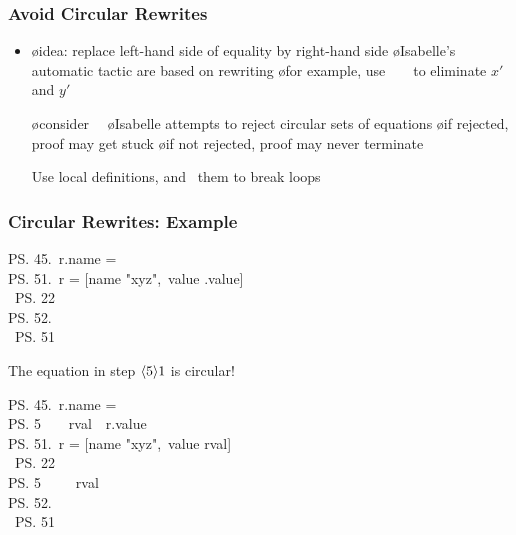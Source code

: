 \begin{frame}
  \frametitle{Avoid Circular Rewrites}

  \begin{itemize}
  \item {}

    \begin{itemize}
    \o idea: replace left-hand side of equality by right-hand side
    \o Isabelle's automatic tactic are based on rewriting
    \o for example, use\ \ \ \ to eliminate $x'$ and $y'$    \end{itemize}

\pause

  \oo {}

    \begin{itemize}
    \o consider\ \ 
    \o Isabelle attempts to reject circular sets of equations
    \o if rejected, proof may get stuck
    \o if not rejected, proof may never terminate
    \end{itemize}

  \oo \alert{Use local definitions, and \HIDE\ them to break loops}
  \end{itemize}
\end{frame}

\begin{frame}
  \frametitle{Circular Rewrites: Example}

  \qquad\begin{tlablock}
    \ps{4}{5.}\ r.name = \\
    \quad\ps{5}{1.}\ r = [name \mapsto "xyz",\ value \mapsto {}.value]\\
    \quad\quad\BY\ \ps{2}{2}\\
    \quad\ps{5}{2.}\ \QED\\
    \quad\quad\BY\ \ps{5}{1}
  \end{tlablock}

\pause

  \vfill\vfill

  \qquad\alert{The equation in step $\langle 5 \rangle 1$ is circular!}

  \vfill\vfill

\pause

  \qquad\begin{tlablock}
    \ps{4}{5.}\ r.name = \\
    \quad\ps{5}{}\ \ \ \DEFINE\ rval\ \deq\ r.value\\
    \quad\ps{5}{1.}\ r = [name \mapsto "xyz",\ value \mapsto rval]\\
    \quad\quad\BY\ \ps{2}{2}\\
    \quad\ps{5}{}\ \ \ \HIDE\ \DEF\ rval\\
    \quad\ps{5}{2.}\ \QED\\
    \quad\quad\BY\ \ps{5}{1}
  \end{tlablock}
\end{frame}

